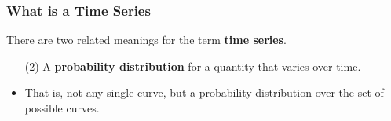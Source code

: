 \documentclass{beamer}
\begin{document}
\begin{frame}
\frametitle{What is a Time Series}
There are two related meanings for the term {\bf time series}.

\begin{itemize}
\item [(2)] A {\bf probability distribution} for a quantity that varies over time.\pause
\item That is, not any single curve, but a probability distribution over the
set of possible curves.
\end{itemize}

\end{frame}
\end{document}
